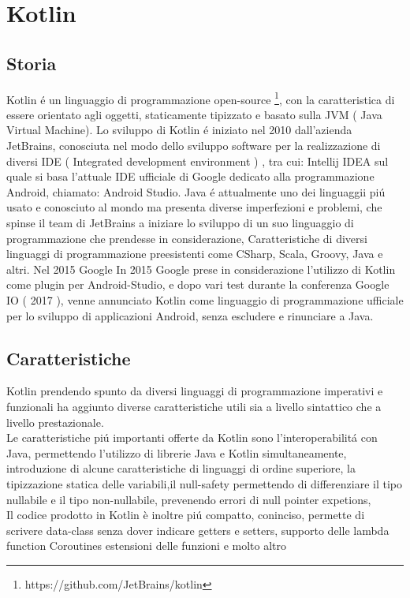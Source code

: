 \chapter{Kotlin}                %
\lhead[\fancyplain{}{\bfseries\thepage}]{\fancyplain{}{\bfseries\rightmark}}
\section{Storia}                 %

Kotlin \'e un linguaggio di programmazione open-source \footnote{https://github.com/JetBrains/kotlin}, con la caratteristica di essere orientato agli oggetti, staticamente tipizzato  e basato sulla JVM ( Java Virtual Machine). Lo sviluppo di Kotlin \'e iniziato nel 2010 dall'azienda JetBrains, conosciuta nel modo dello sviluppo software per la realizzazione di diversi IDE ( Integrated development environment ) , tra cui: Intellij IDEA sul quale si basa l'attuale IDE ufficiale di Google dedicato alla programmazione Android, chiamato: Android Studio. Java \'e attualmente uno dei linguaggii  pi\'u usato e conosciuto al mondo ma presenta diverse imperfezioni e problemi, che spinse il team di JetBrains a iniziare lo sviluppo di un suo linguaggio di programmazione che prendesse in considerazione, Caratteristiche di diversi linguaggi di programmazione preesistenti come CSharp, Scala, Groovy, Java e altri. Nel 2015 Google In 2015 Google prese in considerazione l'utilizzo di Kotlin come plugin per Android-Studio, e dopo vari test durante la conferenza Google IO ( 2017 ), venne annunciato Kotlin come linguaggio di programmazione ufficiale per lo sviluppo di applicazioni Android, senza escludere e rinunciare a Java.


\section{Caratteristiche}
Kotlin prendendo spunto da diversi linguaggi di programmazione imperativi e funzionali ha aggiunto diverse caratteristiche utili sia a livello sintattico che a livello prestazionale. \\
Le caratteristiche pi\'u importanti offerte da Kotlin sono l'interoperabilit\'a con Java, permettendo l'utilizzo di librerie Java e Kotlin simultaneamente, introduzione di alcune caratteristiche di linguaggi di ordine superiore, la tipizzazione statica delle variabili,il null-safety permettendo di differenziare il tipo nullabile e il tipo non-nullabile, prevenendo errori di null pointer expetions, \\
Il codice prodotto in Kotlin \`e inoltre pi\'u compatto, coninciso, permette di scrivere data-class senza dover indicare getters e setters, supporto delle lambda function Coroutines estensioni delle funzioni e molto altro

